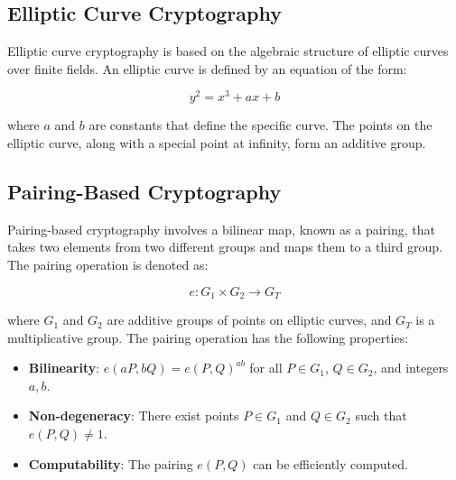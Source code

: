 \documentclass[cic,tc,english]{iiufrgs}
\begin{document}
\subsection{Elliptic Curve Cryptography}

Elliptic curve cryptography is based on the algebraic structure of elliptic curves over finite fields. An elliptic curve is defined by an equation of the form:

\begin{equation}
y^2 = x^3 + ax + b
\end{equation}

where \(a\) and \(b\) are constants that define the specific curve. The points on the elliptic curve, along with a special point at infinity, form an additive group.

\subsection{Pairing-Based Cryptography}

Pairing-based cryptography involves a bilinear map, known as a pairing, that takes two elements from two different groups and maps them to a third group. The pairing operation is denoted as:

\begin{equation}
e: G_1 \times G_2 \rightarrow G_T
\end{equation}

where \(G_1\) and \(G_2\) are additive groups of points on elliptic curves, and \(G_T\) is a multiplicative group. The pairing operation has the following properties:

\begin{itemize}
    \item \textbf{Bilinearity}: \(e(aP, bQ) = e(P, Q)^{ab}\) for all \(P \in G_1\), \(Q \in G_2\), and integers \(a, b\).
    \item \textbf{Non-degeneracy}: There exist points \(P \in G_1\) and \(Q \in G_2\) such that \(e(P, Q) \neq 1\).
    \item \textbf{Computability}: The pairing \(e(P, Q)\) can be efficiently computed.
\end{itemize}        
    

\end{document}
